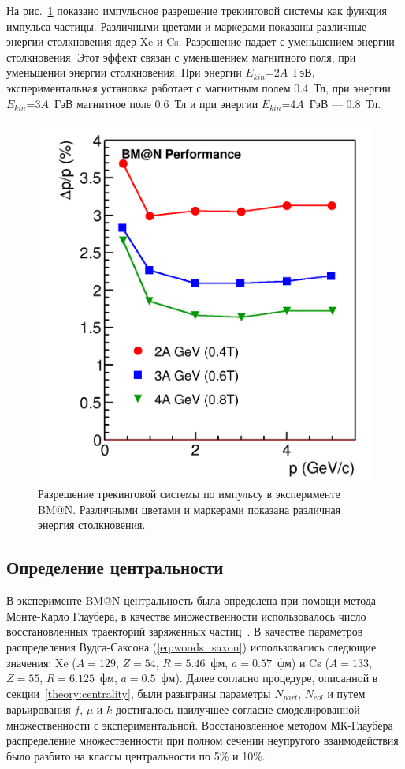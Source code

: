 На рис.~\ref{fig:bmn_mom_res} показано импульсное разрешение трекинговой системы как функция импульса частицы.
Различными цветами и маркерами показаны различные энергии столкновения ядер Xe и Cs.
Разрешение падает с уменьшением энергии столкновения. 
Этот эффект связан с уменьшением магнитного поля, при уменьшении энергии столкновения. 
При энергии $E_{kin}$=2$A$~ГэВ, экспериментальная установка работает с магнитным полем 0.4~Тл, при энергии $E_{kin}$=3$A$~ГэВ магнитное поле 0.6~Тл и при энергии $E_{kin}$=4$A$~ГэВ --- 0.8~Тл.
%
\begin{figure}[ht]
\begin{center}
\includegraphics[width=0.55\linewidth]{images/momentum_resolution.png}
\caption{Разрешение трекинговой системы по импульсу в эксперименте BM@N. Различными цветами и маркерами показана различная энергия столкновения.}
\label{fig:bmn_mom_res}
\end{center}
\end{figure}

\subsection{Определение центральности}

В эксперименте BM@N центральность была определена при помощи метода Монте-Карло Глаубера, в качестве множественности использовалось число восстановленных траекторий заряженных частиц~\cite{Segal:2023njv}.
В качестве параметров распределения Вудса-Саксона (\ref{eq:woods_saxon}) использовались следющие значения: Xe ($A=129$, $Z=54$, $R=5.46$~фм, $a=0.57$~фм) и Cs ($A=133$, $Z=55$, $R=6.125$~фм, $a=0.5$~фм).
Далее согласно процедуре, описанной в секции~\ref{theory:centrality}, были разыграны параметры $N_{part}$, $N_{col}$ и путем варьирования $f$, $\mu$ и $k$ достигалось наилучшее согласие смоделированной множественности с экспериментальной.
Восстановленное методом МК-Глаубера распределение множественности при полном сечении неупругого взаимодействия было разбито на классы центральности по 5\% и 10\%.

